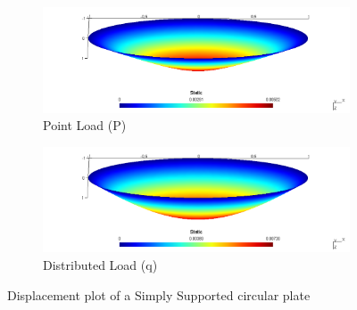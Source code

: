 \documentclass[main.tex]{subfiles}
\begin{document}
\begin{figure}[h!]
\begin{subfigure}{1\textwidth}
\includegraphics[width=\linewidth,trim={0cm 0 0cm 0},clip]{images/appedix_sim_result/C_SS_P.png}
\caption{Point Load (P)}
\end{subfigure}\vfill
\begin{subfigure}{1\textwidth}
\includegraphics[width=\linewidth,trim={0cm 0 0cm 0},clip]{images/appedix_sim_result/C_SS_q.png}
\caption{Distributed Load (q)}
\end{subfigure}
\caption{Displacement plot of a Simply Supported circular plate}
\end{figure}
\end{document}
